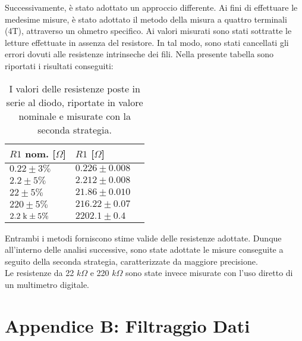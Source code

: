 \documentclass{article}[a4paper, oneside, 11pt]
\begin{document}
Successivamente, è stato adottato un approccio differente. Ai fini di effettuare le medesime
misure, è stato adottato il metodo della misura a quattro terminali (4T), attraverso un ohmetro
specifico. Ai valori misurati sono stati sottratte le letture effettuate in assenza del resistore.
In tal modo, sono stati cancellati gli errori dovuti alle resistenze intrinseche dei fili. Nella
presente tabella sono riportati i risultati conseguiti:

\begin{table}[H]
\begin{center}
    \begin{tabular}{lll}
     \toprule
     $R1$ nom. [$\Omega$] & $R1$ [$\Omega$] \\
     \midrule
     \midrule
     $0.22 \pm 3 \% $     & $0.226 \pm 0.008$ \\
     $2.2 \pm 5 \% $     & $2.212 \pm 0.008$ \\
     $22 \pm 5 \% $     & $21.86 \pm 0.010$ \\
        $220 \pm 5 \% $     & $216.22 \pm 0.07$ \\
     $2.2\; \rm k \pm 5 \% $ & $2202.1 \pm 0.4$ \\
     \bottomrule
    \end{tabular}
    \caption{I valori delle resistenze poste in serie al diodo, riportate in
        valore nominale e misurate con la seconda strategia. \label{tab:res}}
\end{center}
\end{table}

Entrambi i metodi forniscono stime valide delle resistenze adottate. Dunque all’interno
delle analisi successive, sono state adottate le misure conseguite a seguito della
seconda strategia, caratterizzate da maggiore precisione.\\
Le resistenze da 22 $k\Omega$ e 220 $k\Omega$ sono state invece misurate con l’uso
diretto di un multimetro digitale.

\section{Appendice B: Filtraggio Dati}\label{app: B}
\end{document}
